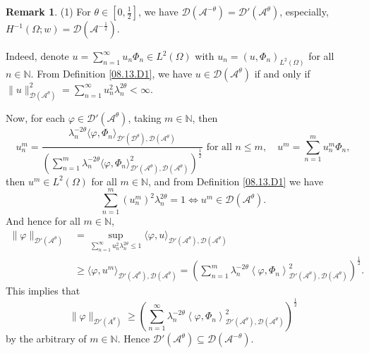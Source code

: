 \documentclass[preprint,12pt]{elsarticle}
\theoremstyle{definition}   %
\newtheorem{remark}[theorem]{Remark}
\numberwithin{equation}{section}
\def\s{\subseteq}
\def\vp{\varphi}
\def\lg{\langle}
\def\llg{\left\langle}
\def\rg{\rangle}
\def\rrg{\right\rangle}
\def\Om{\Omega}
\def\la{\lambda}
\def\iy{\infty}
\def\f{\frac}
\def\Lra{\Leftrightarrow}
\def\mcA{\mathcal{A}}
\def\mcD{\mathcal{D}}
\newcommand{\N}{\mathbb N}
\begin{document}
\begin{remark}\label{08.13.R2}
	(1) For $\theta\in [0,\f{1}{2}]$, we have $\mcD(\mcA^{-\theta})=\mcD'(\mcA^\theta)$,  especially,  $H^{-1}(\Om;w)=\mcD(\mcA^{-\f{1}{2}})$. 
	
	Indeed, denote  $u=\sum_{n=1}^\iy u_n\Phi_n\in L^2(\Om)$ with $u_n=(u,\Phi_n)_{L^2(\Om)}$ for all $n\in\N$.  From Definition \ref{08.13.D1}, we have $u\in \mcD(\mcA^\theta)$ if and only if $\|u\|_{\mcD(\mcA^\theta)}^2=\sum_{n=1}^\iy u_n^2\la_n^{2\theta}<\iy$. 
	
	Now, for each $\vp\in \mcD'(\mcA^{\theta})$, taking $m\in\N$, then 
	\begin{equation*}
		u_n^m=\f{\la_n^{-2\theta}\lg \vp,\Phi_n\rg_{\mcD'(\mcD^\theta), \mcD(\mcA^\theta)}}{\left(\sum_{n=1}^m \la_n^{-2\theta}\lg\vp,\Phi_n\rg_{\mcD'(\mcA^\theta), \mcD(\mcA^\theta)}^2\right)^\f{1}{2}} \mbox{ for all } n\leq m, \quad u^m=\sum_{n=1}^m u_n^m\Phi_n, 
	\end{equation*}
	then $u^m\in L^2(\Om)$  for all $m\in\N$, and from Definition \ref{08.13.D1} we have 
	\begin{equation*}
		\sum_{n=1}^m (u_n^m)^2\la_n^{2\theta}=1\Lra u^m\in \mcD(\mcA^\theta). 
	\end{equation*}
	And hence for all $m\in\N$, 
	\begin{equation*}
		\begin{split}
			\|\vp\|_{\mcD'(\mcA^{\theta})}
			&=\sup_{
				\sum_{n=1}^\iy u_n^2\la_n^{2\theta}\leq 1}\lg \vp, u\rg_{\mcD'(\mcA^\theta), \mcD(\mcA^\theta)}\\
			&\geq \lg\vp, u^m\rg_{\mcD'(\mcA^\theta), \mcD(\mcA^\theta)}=\left(\sum_{n=1}^m \la_n^{-2\theta}\llg \vp, \Phi_n\rrg_{\mcD'(\mcA^\theta), \mcD(\mcA^\theta)}^2\right)^\f{1}{2}.
		\end{split}
	\end{equation*}
	This implies that 
	\begin{equation*}
		\|\vp\|_{\mcD'(A^\theta)}\geq \left(\sum_{n=1}^\iy \la_n^{-2\theta}\llg \vp, \Phi_n\rrg_{\mcD'(\mcA^\theta), \mcD(\mcA^\theta)}^2\right)^\f{1}{2}
	\end{equation*}
	by the arbitrary of $m\in\N$. 
	Hence $\mcD'(\mcA^\theta)\s \mcD(\mcA^{-\theta})$. 
	

\end{remark}
\end{document}
